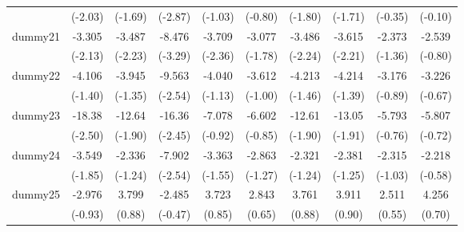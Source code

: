 {\begin{tabular}{l*{9}{c}}
            &     (-2.03)         &     (-1.69)         &     (-2.87)         &     (-1.03)         &     (-0.80)         &     (-1.80)         &     (-1.71)         &     (-0.35)         &     (-0.10)         \\
[1em]
dummy21     &      -3.305\sym{*}  &      -3.487\sym{*}  &      -8.476\sym{**} &      -3.709\sym{*}  &      -3.077         &      -3.486\sym{*}  &      -3.615\sym{*}  &      -2.373         &      -2.539         \\
            &     (-2.13)         &     (-2.23)         &     (-3.29)         &     (-2.36)         &     (-1.78)         &     (-2.24)         &     (-2.21)         &     (-1.36)         &     (-0.80)         \\
[1em]
dummy22     &      -4.106         &      -3.945         &      -9.563\sym{*}  &      -4.040         &      -3.612         &      -4.213         &      -4.214         &      -3.176         &      -3.226         \\
            &     (-1.40)         &     (-1.35)         &     (-2.54)         &     (-1.13)         &     (-1.00)         &     (-1.46)         &     (-1.39)         &     (-0.89)         &     (-0.67)         \\
[1em]
dummy23     &      -18.38\sym{*}  &      -12.64         &      -16.36\sym{*}  &      -7.078         &      -6.602         &      -12.61         &      -13.05         &      -5.793         &      -5.807         \\
            &     (-2.50)         &     (-1.90)         &     (-2.45)         &     (-0.92)         &     (-0.85)         &     (-1.90)         &     (-1.91)         &     (-0.76)         &     (-0.72)         \\
[1em]
dummy24     &      -3.549         &      -2.336         &      -7.902\sym{*}  &      -3.363         &      -2.863         &      -2.321         &      -2.381         &      -2.315         &      -2.218         \\
            &     (-1.85)         &     (-1.24)         &     (-2.54)         &     (-1.55)         &     (-1.27)         &     (-1.24)         &     (-1.25)         &     (-1.03)         &     (-0.58)         \\
[1em]
dummy25     &      -2.976         &       3.799         &      -2.485         &       3.723         &       2.843         &       3.761         &       3.911         &       2.511         &       4.256         \\
            &     (-0.93)         &      (0.88)         &     (-0.47)         &      (0.85)         &      (0.65)         &      (0.88)         &      (0.90)         &      (0.55)         &      (0.70)         \\

\end{tabular}}
